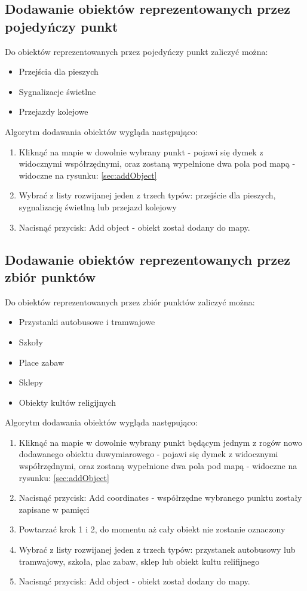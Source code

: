 \newpage
\subsection{Dodawanie obiektów reprezentowanych przez pojedyńczy punkt}
Do obiektów reprezentowanych przez pojedyńczy punkt zaliczyć można:
\begin{itemize}
\item Przejścia dla pieszych
\item Sygnalizacje świetlne
\item Przejazdy kolejowe
\end{itemize}

Algorytm dodawania obiektów wygląda następująco:
\begin{enumerate}
\item Kliknąć na mapie w dowolnie wybrany punkt - pojawi się dymek z widocznymi współrzędnymi, oraz zostaną wypełnione dwa pola pod mapą - widoczne na rysunku: \ref{sec:addObject}
\item Wybrać z listy rozwijanej jeden z trzech typów: przejście dla pieszych, sygnalizację świetlną lub przejazd kolejowy
\item Nacisnąć przycisk: Add object - obiekt został dodany do mapy.
\end{enumerate} 

\subsection{Dodawanie obiektów reprezentowanych przez zbiór punktów}
Do obiektów reprezentowanych przez zbiór punktów zaliczyć można:
\begin{itemize}
\item Przystanki autobusowe i tramwajowe
\item Szkoły
\item Place zabaw
\item Sklepy
\item Obiekty kultów religijnych
\end{itemize}

Algorytm dodawania obiektów wygląda następująco:
\begin{enumerate}
\item Kliknąć na mapie w dowolnie wybrany punkt będącym jednym z rogów nowo dodawanego obiektu duwymiarowego - pojawi się dymek z widocznymi współrzędnymi, oraz zostaną wypełnione dwa pola pod mapą - widoczne na rysunku: \ref{sec:addObject}
\item Nacisnąć przycisk: Add coordinates - współrzędne wybranego punktu zostały zapisane w pamięci
\item Powtarzać krok 1 i 2, do momentu aż cały obiekt nie zostanie oznaczony
\item Wybrać z listy rozwijanej jeden z trzech typów: przystanek autobusowy lub tramwajowy, szkoła, plac zabaw, sklep lub obiekt kultu relifijnego
\item Nacisnąć przycisk: Add object - obiekt został dodany do mapy.
\end{enumerate} 